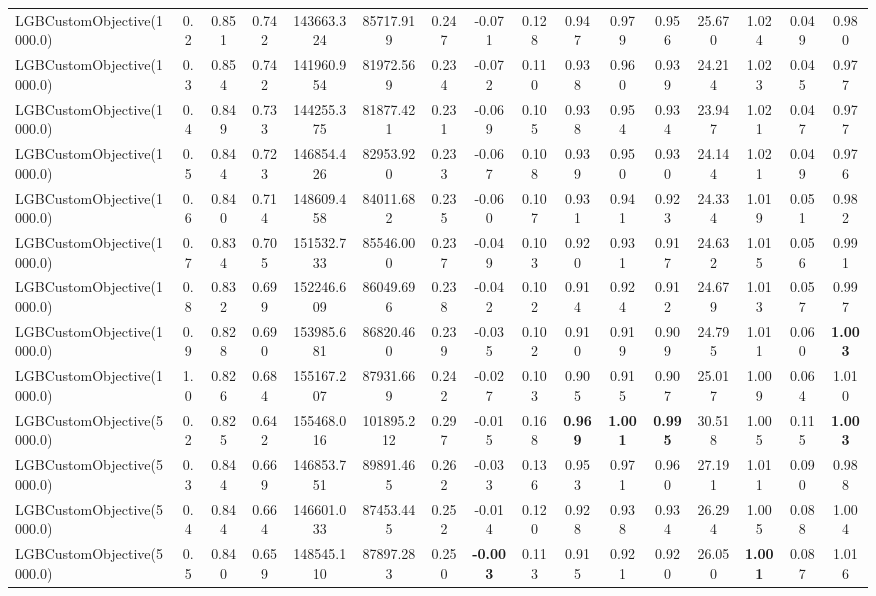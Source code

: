 \documentclass[11pt]{article}
\theoremstyle{plain}
\theoremstyle{definition}
\newcommand{\1}{\mathbf{1}}
\begin{document}
\begin{table}[h]
{\begin{tabular}{lccccccccccccccc}
LGBCustomObjective(1000.0) & 0.2 & 0.851 & 0.742 & 143663.324 & 85717.919 & 0.247 & -0.071 & 0.128 & 0.947 & 0.979 & 0.956 & 25.670 & 1.024 & 0.049 & 0.980 \\
LGBCustomObjective(1000.0) & 0.3 & 0.854 & 0.742 & 141960.954 & 81972.569 & 0.234 & -0.072 & 0.110 & 0.938 & 0.960 & 0.939 & 24.214 & 1.023 & 0.045 & 0.977 \\
LGBCustomObjective(1000.0) & 0.4 & 0.849 & 0.733 & 144255.375 & 81877.421 & 0.231 & -0.069 & 0.105 & 0.938 & 0.954 & 0.934 & 23.947 & 1.021 & 0.047 & 0.977 \\
LGBCustomObjective(1000.0) & 0.5 & 0.844 & 0.723 & 146854.426 & 82953.920 & 0.233 & -0.067 & 0.108 & 0.939 & 0.950 & 0.930 & 24.144 & 1.021 & 0.049 & 0.976 \\
LGBCustomObjective(1000.0) & 0.6 & 0.840 & 0.714 & 148609.458 & 84011.682 & 0.235 & -0.060 & 0.107 & 0.931 & 0.941 & 0.923 & 24.334 & 1.019 & 0.051 & 0.982 \\
LGBCustomObjective(1000.0) & 0.7 & 0.834 & 0.705 & 151532.733 & 85546.000 & 0.237 & -0.049 & 0.103 & 0.920 & 0.931 & 0.917 & 24.632 & 1.015 & 0.056 & 0.991 \\
LGBCustomObjective(1000.0) & 0.8 & 0.832 & 0.699 & 152246.609 & 86049.696 & 0.238 & -0.042 & 0.102 & 0.914 & 0.924 & 0.912 & 24.679 & 1.013 & 0.057 & 0.997 \\
LGBCustomObjective(1000.0) & 0.9 & 0.828 & 0.690 & 153985.681 & 86820.460 & 0.239 & -0.035 & 0.102 & 0.910 & 0.919 & 0.909 & 24.795 & 1.011 & 0.060 & \textbf{1.003} \\
LGBCustomObjective(1000.0) & 1.0 & 0.826 & 0.684 & 155167.207 & 87931.669 & 0.242 & -0.027 & 0.103 & 0.905 & 0.915 & 0.907 & 25.017 & 1.009 & 0.064 & 1.010 \\
LGBCustomObjective(5000.0) & 0.2 & 0.825 & 0.642 & 155468.016 & 101895.212 & 0.297 & -0.015 & 0.168 & \textbf{0.969} & \textbf{1.001} & \textbf{0.995} & 30.518 & 1.005 & 0.115 & \textbf{1.003} \\
LGBCustomObjective(5000.0) & 0.3 & 0.844 & 0.669 & 146853.751 & 89891.465 & 0.262 & -0.033 & 0.136 & 0.953 & 0.971 & 0.960 & 27.191 & 1.011 & 0.090 & 0.988 \\
LGBCustomObjective(5000.0) & 0.4 & 0.844 & 0.664 & 146601.033 & 87453.445 & 0.252 & -0.014 & 0.120 & 0.928 & 0.938 & 0.934 & 26.294 & 1.005 & 0.088 & 1.004 \\
LGBCustomObjective(5000.0) & 0.5 & 0.840 & 0.659 & 148545.110 & 87897.283 & 0.250 & \textbf{-0.003} & 0.113 & 0.915 & 0.921 & 0.920 & 26.050 & \textbf{1.001} & 0.087 & 1.016 \\

\end{tabular}}
\end{table}
\end{document}
